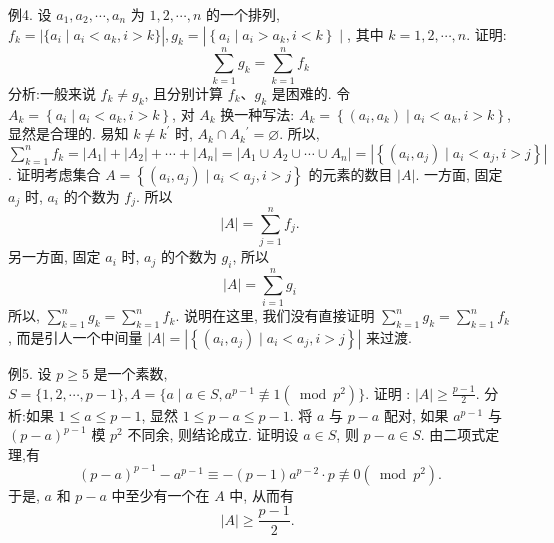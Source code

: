 例4. 设 $a_1, a_2, \cdots, a_n$ 为 $1,2, \cdots, n$ 的一个排列, $f_k=\mid\{a_i \mid a_i<a_k, i>k\}\left|, g_k=\right|\left\{a_i \mid a_i>a_k, i<k\right\} \mid$, 其中 $k=1,2, \cdots, n$. 证明:
$$
\sum_{k=1}^n g_k=\sum_{k=1}^n f_k
$$
分析:一般来说 $f_k \neq g_k$, 且分别计算 $f_k 、 g_k$ 是困难的.
令 $A_k=\left\{a_i\mid a_i<a_k, i>k\right\}$, 对 $A_k$ 换一种写法: $A_k=\left\{\left(a_i, a_k\right) \mid a_i<a_k, i>k\right\}$, 显然是合理的.
易知 $k \neq k^{\prime}$ 时, $A_k \cap A_k{ }^{\prime}=\varnothing$. 所以, $\sum_{k=1}^n f_k=\left|A_1\right|+\left|A_2\right|+\cdots+\left|A_n\right|=\left|A_1 \cup A_2 \cup \cdots \cup A_n\right|=\left|\left\{\left(a_i, a_j\right) \mid a_i<a_j, i>j\right\}\right|$.
证明考虑集合 $A=\left\{\left(a_i, a_j\right) \mid a_i<a_j, i>j\right\}$ 的元素的数目 $|A|$. 一方面, 固定 $a_j$ 时, $a_i$ 的个数为 $f_j$. 所以
$$
|A|=\sum_{j=1}^n f_j .
$$
另一方面, 固定 $a_i$ 时, $a_j$ 的个数为 $g_i$, 所以
$$
|A|=\sum_{i=1}^n g_i
$$
所以, $\sum_{k=1}^n g_k=\sum_{k=1}^n f_k$.
说明在这里, 我们没有直接证明 $\sum_{k=1}^n g_k=\sum_{k=1}^n f_k$, 而是引人一个中间量 $|A|=\left|\left\{\left(a_i, a_j\right) \mid a_i<a_j, i>j\right\}\right|$ 来过渡.



例5. 设 $p \geqslant 5$ 是一个素数, $S=\{1,2, \cdots, p-1\}, A=\{a \mid a \in S, a^{p-1} \not \equiv 1\left(\bmod p^2\right) \}$. 证明 : $|A| \geqslant \frac{p-1}{2}$.
分析:如果 $1 \leqslant a \leqslant p-1$, 显然 $1 \leqslant p-a \leqslant p-1$. 将 $a$ 与 $p-a$ 配对, 如果 $a^{p-1}$ 与 $(p-a)^{p-1}$ 模 $p^2$ 不同余, 则结论成立.
证明设 $a \in S$, 则 $p-a \in S$. 由二项式定理,有
$$
(p-a)^{p-1}-a^{p-1} \equiv-(p-1) a^{p-2} \cdot p \not \equiv 0\left(\bmod p^2\right) .
$$
于是, $a$ 和 $p-a$ 中至少有一个在 $A$ 中, 从而有
$$
|A| \geqslant \frac{p-1}{2} \text {. }
$$



